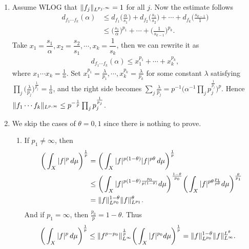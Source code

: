 \begin{enumerate}
\item[1.1.15.]
   Assume WLOG that $\Vert f_{j} \Vert_{L^{p_{j},\infty}}=1$ for all $j$. Now the estimate follows
   \begin{equation*}\begin{aligned}
   d_{f_{1}\cdots f_{k}}(\alpha) &\leq d_{f_{1}}\Big(\frac{\alpha}{s_{1}}\Big)
   +d_{f_{2}}\Big(\frac{s_{1}}{s_{2}}\Big)+\cdots+d_{f_{k}}\Big(\frac{s_{k-1}}{1}\Big)
   \\&\leq \Big(\frac{s_{1}}{\alpha}\Big)^{p_{1}}+\cdots+\Big(\frac{1}{s_{k-1}}\Big)^{p_{k}}.
   \end{aligned}\end{equation*}
   Take $x_{1}=\dfrac{s_{1}}{\alpha},x_{2}=\dfrac{s_{2}}{s_{1}},\cdots,x_{k}=\dfrac{1}{s_{k}}$, 
   then we can rewrite it as
   \begin{equation*}\begin{aligned}
   d_{f_{1}\cdots f_{k}}(\alpha) \leq x_{1}^{p_{1}}+\cdots+x_{k}^{p_{k}},
   \end{aligned}\end{equation*}
   where $x_{1}\cdots x_{k}=\frac{1}{\alpha}$. 
   Set $x_1^{p_1}=\frac{\lambda}{p_1},\cdots,x_k^{p_k}=\frac{\lambda}{p_k}$ 
   for some constant $\lambda$ satisfying 
   $\prod_j\big(\frac{\lambda}{p_j}\big)^\frac{1}{p_j}=\frac{1}{\alpha}$, 
   and the right side becomes $\sum_j\frac{\lambda}{p_j}
   =p^{-1}\Big(\alpha^{-1}\prod_jp_j^\frac{1}{p_j}\Big)^p$. 
   Hence $\Vert f_1\cdots f_k \Vert_{L^{p,\infty}}
   \leq p^{-\frac{1}{p}}\prod_{j}p_{j}^{\frac{1}{p_{j}}}$.

\item[1.1.16. ]
   We skip the cases of $\theta=0,1$ since there is nothing to prove.
   \begin{enumerate}
   \item[(a)] If $p_{1} \neq \infty$, then
   \begin{equation*}\begin{aligned}
   \bigg(\int_{X}|f|^{p}\,d\mu\bigg)^{\frac{1}{p}} 
   &= \bigg(\int_{X}|f|^{p(1-\theta)}|f|^{p\theta}\,d\mu\bigg)^{\frac{1}{p}}\\
   &\leq \bigg(\int_{X}|f|^{p(1-\theta)\frac{p_{0}}{p(1-\theta)}}d\mu\bigg)^{\frac{1-\theta}{p_{0}}}
   \bigg(\int_{X}|f|^{p\theta\frac{p_{1}}{p\theta}}d\mu\bigg)^{\frac{\theta}{p_{1}}}\\
   &= \Vert f \Vert_{L^{p_{0}}}^{1-\theta}\Vert f \Vert_{L^{p_{1}}}^{\theta}.
   \end{aligned}\end{equation*}
   And if $p_{1} = \infty$, then $\frac{p_{0}}{p}=1-\theta$. Thus
   \begin{equation*}\begin{aligned}
   \bigg(\int_{X}|f|^{p}\,d\mu\bigg)^{\frac{1}{p}} 
   &\leq \Vert f^{p-p_{0}} \Vert_{L^{\infty}}^{\frac{1}{p}}\bigg(\int_{X}|f|^{p_{0}}d\mu\bigg)^{\frac{1}{p}} 
   = \Vert f \Vert_{L^{p_{0}}}^{1-\theta}\Vert f \Vert_{L^{\infty}}^{L^{\theta}}.
   \end{aligned}\end{equation*}


\end{enumerate}
\end{enumerate}

